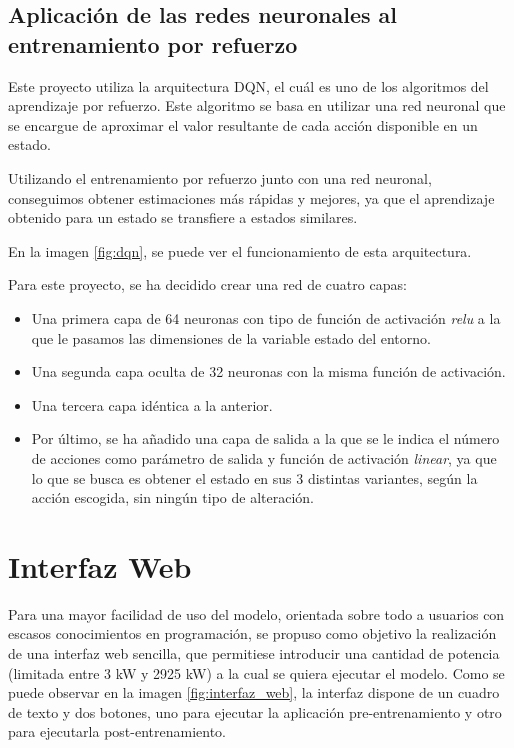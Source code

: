 \subsection{Aplicación de las redes neuronales al entrenamiento por refuerzo}

Este proyecto utiliza la arquitectura DQN, el cuál es uno de los algoritmos del aprendizaje por refuerzo. Este algoritmo se basa en utilizar una red neuronal que se encargue de aproximar el valor resultante de cada acción disponible en un estado.

Utilizando el entrenamiento por refuerzo junto con una red neuronal, conseguimos obtener estimaciones más rápidas y mejores, ya que el aprendizaje obtenido para un estado se transfiere a estados similares.

En la imagen \ref{fig:dqn}, se puede ver el funcionamiento de esta arquitectura.

\label{fig:dqn}

Para este proyecto, se ha decidido crear una red de cuatro capas:
\begin{itemize}
    \item Una primera capa de 64 neuronas con tipo de función de activación \textit{relu} a la que le pasamos las dimensiones de la variable estado del entorno.
    \item Una segunda capa oculta de 32 neuronas con la misma función de activación.
    \item Una tercera capa idéntica a la anterior.
    \item Por último, se ha añadido una capa de salida a la que se le indica el número de acciones como parámetro de salida y función de activación \textit{linear}, ya que lo que se busca es obtener el estado en sus 3 distintas variantes, según la acción escogida, sin ningún tipo de alteración.
\end{itemize}


\section{Interfaz Web}

Para una mayor facilidad de uso del modelo, orientada sobre todo a usuarios con escasos conocimientos en programación, se propuso como objetivo la realización de una interfaz web sencilla, que permitiese introducir una cantidad de potencia (limitada entre 3 kW y 2925 kW) a la cual se quiera ejecutar el modelo.
Como se puede observar en la imagen \ref{fig:interfaz_web}, la interfaz dispone de un cuadro de texto y dos botones, uno para ejecutar la aplicación pre-entrenamiento y otro para ejecutarla post-entrenamiento.

\label{fig:interfaz_web}